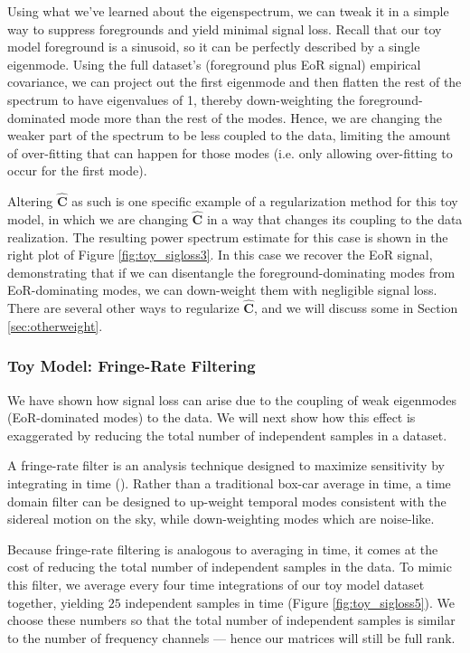 \documentclass[preprint2,numberedappendix,tighten]{aastex6}  %
\newcommand{\cc}[1]{{\color{purple} \textbf{[CC: #1]}}}
\begin{document}
Using what we've learned about the eigenspectrum, we can tweak it in a simple way to suppress foregrounds and yield minimal 
signal loss. Recall that our toy model foreground is a sinusoid, so it can be perfectly described by a single eigenmode. Using the full dataset's (foreground plus EoR signal) empirical covariance, we can 
project out the first eigenmode and then flatten the rest of the spectrum to have eigenvalues of 1, thereby down-weighting the foreground-dominated mode more than the rest of the modes. Hence, we are changing the weaker part of the spectrum to be less coupled to the data, limiting the amount of over-fitting that can happen for those modes (i.e. only allowing over-fitting to occur for the first mode).

Altering $\widehat{\textbf{C}}$ as such is one specific example of a regularization method for this toy model, in which we are 
changing $\widehat{\textbf{C}}$ in a way that changes its coupling to the data realization. The resulting 
power spectrum estimate for this case is shown in the right plot of Figure \ref{fig:toy_sigloss3}. In this case we recover the EoR signal, 
demonstrating that if we can disentangle the foreground-dominating modes from EoR-dominating modes, we can down-weight 
them with negligible signal loss. There are several other ways to regularize $\widehat{\textbf{C}}$, and we will discuss some in Section 
\ref{sec:otherweight}.

\subsubsection{Toy Model: Fringe-Rate Filtering}
\label{sec:toymodel_frf}

We have shown how signal loss can arise due to the coupling of weak eigenmodes (EoR-dominated modes) to the data. We will next show how this effect is exaggerated by reducing the total number of independent 
samples in a dataset. 

A fringe-rate filter is an analysis technique designed to maximize sensitivity by integrating in time (\citealt{parsons_et_al2016}). 
Rather than a traditional box-car average in time, a time domain filter can be designed to up-weight temporal modes consistent with 
the sidereal motion on the sky, while down-weighting modes which are noise-like. 

Because fringe-rate filtering is analogous to averaging in time, it comes at the cost of reducing the total number of independent 
samples in the data. To mimic this filter, we average every four time integrations of our toy model dataset together, yielding 
$25$ independent samples in time (Figure \ref{fig:toy_sigloss5}). We choose these numbers so that the total number of 
independent samples is similar to the number of frequency channels --- hence our matrices will still be full rank.
\end{document}
